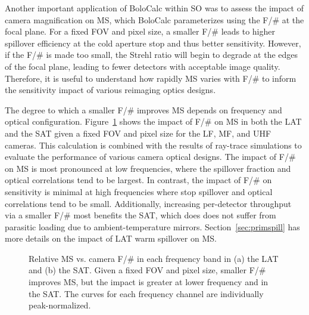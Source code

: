 Another important application of BoloCalc within SO was to assess the impact of camera magnification on MS, which BoloCalc parameterizes using the F/\# at the focal plane. For a fixed FOV and pixel size, a smaller F/\# leads to higher spillover efficiency at the cold aperture stop and thus better sensitivity. However, if the F/\# is made too small, the Strehl ratio will begin to degrade at the edges of the focal plane, leading to fewer detectors with acceptable image quality. Therefore, it is useful to understand how rapidly MS varies with F/\# to inform the sensitivity impact of various reimaging optics designs. 

The degree to which a smaller F/\# improves MS depends on frequency and optical configuration. Figure~\ref{fig:bolocalc_so_fnum} shows the impact of F/\# on MS in both the LAT and the SAT given a fixed FOV and pixel size for the LF, MF, and UHF cameras. This calculation is combined with the results of ray-trace simulations to evaluate the performance of various camera optical designs.
The impact of F/\# on MS is most pronounced at low frequencies, where the spillover fraction and optical correlations tend to be largest. In contrast, the impact of F/\# on sensitivity is minimal at high frequencies where stop spillover and optical correlations tend to be small. Additionally, increasing per-detector throughput via a smaller F/\# most benefits the SAT, which does does not suffer from parasitic loading due to ambient-temperature mirrors. Section~\ref{sec:primspill} has more details on the impact of LAT warm spillover on MS.

\begin{figure}[!t]
    \hfill
    \caption{Relative MS vs. camera F/\# in each frequency band in (a) the LAT and (b) the SAT. Given a fixed FOV and pixel size, smaller F/\# improves MS, but the impact is greater at lower frequency and in the SAT. The curves for each frequency channel are individually peak-normalized. \label{fig:bolocalc_so_fnum}}
\end{figure}

